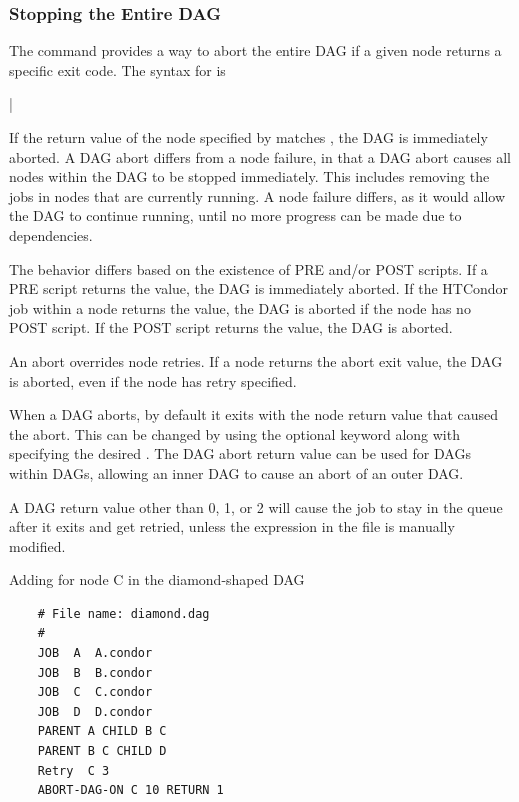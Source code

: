 \subsubsection{\label{dagman:abort}Stopping the Entire DAG}

The  command provides a way
to abort the entire DAG if a given node returns a specific exit
code.  The syntax for  is

 | 

If the return value of the node specified by 
matches ,
the DAG is immediately aborted.
A DAG abort differs from a node failure,
in that a DAG abort causes all nodes within the DAG to be stopped immediately.
This includes removing the jobs in nodes that are currently running.
A node failure differs, as it would allow the DAG to continue running,
until no more progress can be made due to dependencies.

The behavior differs based on the existence of PRE and/or POST scripts.
If a PRE script returns the  value,
the DAG is immediately aborted.
If the HTCondor job within a node returns the  value,
the DAG is aborted if the node has no POST script.
If the POST script returns the  value, the DAG is aborted.

An abort overrides node retries. 
If a node returns the abort exit value,
the DAG is aborted,
even if the node has retry specified.

When a DAG aborts, by default it exits with the node return value that
caused the abort.  This can be changed by 
using  the optional  keyword along
with specifying the desired .
The DAG abort return value
can be used for DAGs within DAGs,
allowing an inner DAG to cause an abort of an outer DAG.

A DAG return value other than 0, 1, or 2 will cause the
 job to stay in the queue after it exits
and get retried, unless the  expression in the
 file is manually modified.

Adding  for node C in the diamond-shaped
DAG
\footnotesize
\begin{verbatim}
    # File name: diamond.dag
    #
    JOB  A  A.condor 
    JOB  B  B.condor 
    JOB  C  C.condor	
    JOB  D  D.condor
    PARENT A CHILD B C
    PARENT B C CHILD D
    Retry  C 3
    ABORT-DAG-ON C 10 RETURN 1
\end{verbatim}
\normalsize

